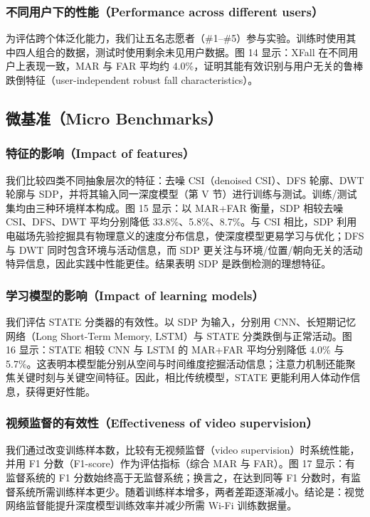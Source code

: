 \documentclass[UTF8,twocolumn]{ctexart}
\begin{document}
\subsubsection{不同用户下的性能（Performance across different users）}
为评估跨个体泛化能力，我们让五名志愿者（\#1--\#5）参与实验。训练时使用其中四人组合的数据，测试时使用剩余未见用户数据。图 14 显示：XFall 在不同用户上表现一致，MAR 与 FAR 平均约 4.0\%，证明其能有效识别与用户无关的鲁棒跌倒特征（user-independent robust fall characteristics）。

\subsection{微基准（Micro Benchmarks）}
\subsubsection{特征的影响（Impact of features）}
我们比较四类不同抽象层次的特征：去噪 CSI（denoised CSI）、DFS 轮廓、DWT 轮廓与 SDP，并将其输入同一深度模型（第 V 节）进行训练与测试。训练/测试集均由三种环境样本构成。图 15 显示：以 MAR+FAR 衡量，SDP 相较去噪 CSI、DFS、DWT 平均分别降低 33.8\%、5.8\%、8.7\%。与 CSI 相比，SDP 利用电磁场先验挖掘具有物理意义的速度分布信息，使深度模型更易学习与优化；DFS 与 DWT 同时包含环境与活动信息，而 SDP 更关注与环境/位置/朝向无关的活动特异信息，因此实践中性能更佳。结果表明 SDP 是跌倒检测的理想特征。

\subsubsection{学习模型的影响（Impact of learning models）}
我们评估 STATE 分类器的有效性。以 SDP 为输入，分别用 CNN、长短期记忆网络（Long Short-Term Memory, LSTM）与 STATE 分类跌倒与正常活动。图 16 显示：STATE 相较 CNN 与 LSTM 的 MAR+FAR 平均分别降低 4.0\% 与 5.7\%。这表明本模型能分别从空间与时间维度挖掘活动信息；注意力机制还能聚焦关键时刻与关键空间特征。因此，相比传统模型，STATE 更能利用人体动作信息，获得更好性能。

\subsubsection{视频监督的有效性（Effectiveness of video supervision）}
我们通过改变训练样本数，比较有无视频监督（video supervision）时系统性能，并用 F1 分数（F1-score）作为评估指标（综合 MAR 与 FAR）。图 17 显示：有监督系统的 F1 分数始终高于无监督系统；换言之，在达到同等 F1 分数时，有监督系统所需训练样本更少。随着训练样本增多，两者差距逐渐减小。结论是：视觉网络监督能提升深度模型训练效率并减少所需 Wi\!-\!Fi 训练数据量。
\end{document}
